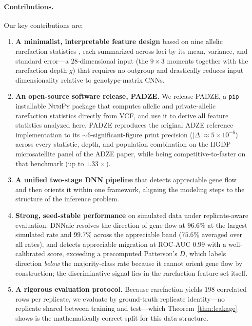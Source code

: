 \documentclass[11pt]{article}
\theoremstyle{plain}
\theoremstyle{definition}
\theoremstyle{remark}
\begin{document}
\paragraph{Contributions.} Our key contributions are:
\begin{enumerate}
  \item \textbf{A minimalist, interpretable feature design} based on nine allelic rarefaction statistics \citep{szpiech2008adze}, each summarized across loci by its mean, variance, and standard error---a $28$-dimensional input (the $9\times 3$ moments together with the rarefaction depth $g$) that requires no outgroup and drastically reduces input dimensionality relative to genotype-matrix CNNs.
  \item \textbf{An open-source software release, \textsc{PADZE}.} We release \textsc{PADZE}, a \texttt{pip}-installable \textsc{NumPy} package that computes allelic and private-allelic rarefaction statistics \citep{szpiech2008adze,kalinowski2004counting} directly from VCF, and use it to derive all feature statistics analyzed here. \textsc{PADZE} reproduces the original ADZE reference implementation to its $\sim$6-significant-figure print precision ($|\Delta|\approx 5\times10^{-6}$) across every statistic, depth, and population combination on the HGDP microsatellite panel of the ADZE paper, while being competitive-to-faster on that benchmark (up to $1.33\times$).
  \item \textbf{A unified two-stage DNN pipeline} that detects appreciable gene flow and then orients it within one framework, aligning the modeling steps to the structure of the inference problem.
  \item \textbf{Strong, seed-stable performance} on simulated data under replicate-aware evaluation. DNNaic resolves the direction of gene flow at \(96.6\%\) at the largest simulated rate and \(99.7\%\) across the appreciable band (\(75.6\%\) averaged over all rates), and detects appreciable migration at ROC-AUC \(0.99\) with a well-calibrated score, exceeding a precomputed Patterson's $D$, which labels direction \emph{below} the majority-class rate because it cannot orient gene flow by construction; the discriminative signal lies in the rarefaction feature set itself.
  \item \textbf{A rigorous evaluation protocol.} Because rarefaction yields $198$ correlated rows per replicate, we evaluate by ground-truth replicate identity---no replicate shared between training and test---which Theorem~\ref{thm:leakage} shows is the mathematically correct split for this data structure.

\end{enumerate}
\end{document}
